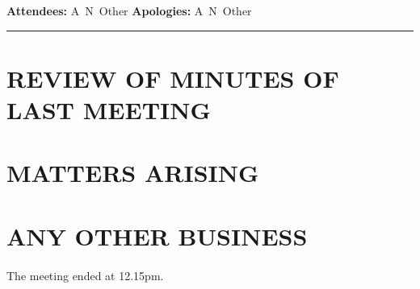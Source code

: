 \documentclass[12pt,a4paper]{article}
\begin{document}
\title{}
\author{}
\date{}
\maketitle

\begin{center}
  \textbf{Attendees:} A~N~Other 
  \textbf{Apologies:} A~N~Other \\
\end{center}

\hrule

\section{REVIEW OF MINUTES OF LAST MEETING}

\section{MATTERS ARISING}

\section{ANY OTHER BUSINESS}

\paragraph{}
The meeting ended at 12.15pm.
\end{document}
